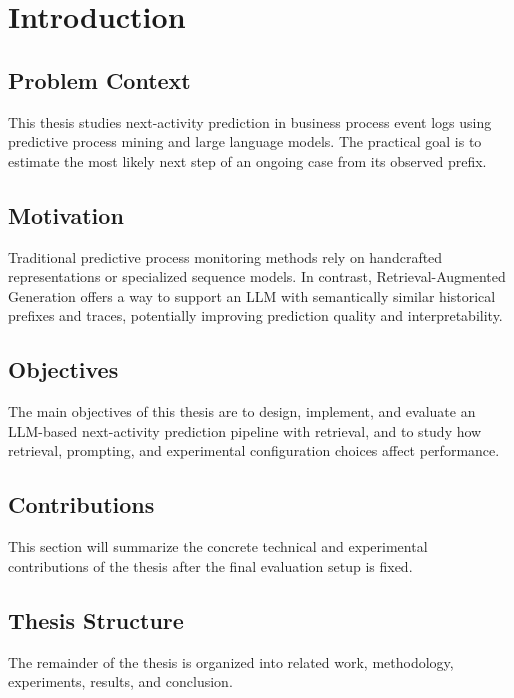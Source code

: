 \chapter{Introduction}

\section{Problem Context}
This thesis studies next-activity prediction in business process event logs using predictive process mining and large language models. The practical goal is to estimate the most likely next step of an ongoing case from its observed prefix.

\section{Motivation}
Traditional predictive process monitoring methods rely on handcrafted representations or specialized sequence models. In contrast, Retrieval-Augmented Generation offers a way to support an LLM with semantically similar historical prefixes and traces, potentially improving prediction quality and interpretability.

\section{Objectives}
The main objectives of this thesis are to design, implement, and evaluate an LLM-based next-activity prediction pipeline with retrieval, and to study how retrieval, prompting, and experimental configuration choices affect performance.

\section{Contributions}
This section will summarize the concrete technical and experimental contributions of the thesis after the final evaluation setup is fixed.

\section{Thesis Structure}
The remainder of the thesis is organized into related work, methodology, experiments, results, and conclusion.

\blankpage
